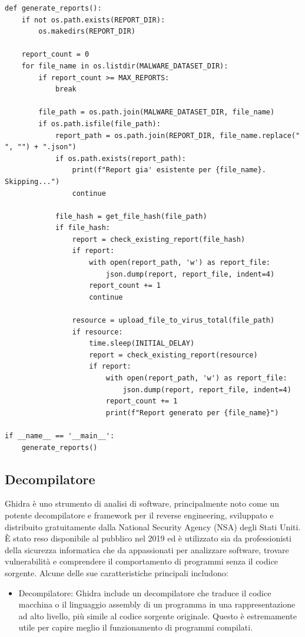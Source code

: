 \begin{lstlisting}[caption={Codice Python per la generazione del report in formato JSON da VirusTotal},captionpos=b]
def generate_reports():
    if not os.path.exists(REPORT_DIR):
        os.makedirs(REPORT_DIR)
    
    report_count = 0
    for file_name in os.listdir(MALWARE_DATASET_DIR):
        if report_count >= MAX_REPORTS:
            break
        
        file_path = os.path.join(MALWARE_DATASET_DIR, file_name)
        if os.path.isfile(file_path):
            report_path = os.path.join(REPORT_DIR, file_name.replace(" ", "") + ".json")
            if os.path.exists(report_path):
                print(f"Report gia' esistente per {file_name}. Skipping...")
                continue
            
            file_hash = get_file_hash(file_path)
            if file_hash:
                report = check_existing_report(file_hash)
                if report:
                    with open(report_path, 'w') as report_file:
                        json.dump(report, report_file, indent=4)
                    report_count += 1
                    continue
                
                resource = upload_file_to_virus_total(file_path)
                if resource:
                    time.sleep(INITIAL_DELAY)  
                    report = check_existing_report(resource)
                    if report:
                        with open(report_path, 'w') as report_file:
                            json.dump(report, report_file, indent=4)
                        report_count += 1
                        print(f"Report generato per {file_name}")

if __name__ == '__main__':
    generate_reports()
\end{lstlisting}

\subsection{Decompilatore}
Ghidra è uno strumento di analisi di software, principalmente noto come un potente decompilatore e framework per il reverse engineering, sviluppato e distribuito gratuitamente dalla National Security Agency (NSA) degli Stati Uniti. È stato reso disponibile al pubblico nel 2019 ed è utilizzato sia da professionisti della sicurezza informatica che da appassionati per analizzare software, trovare vulnerabilità e comprendere il comportamento di programmi senza il codice sorgente. Alcune delle sue caratteristiche principali includono:
\begin{itemize}
    \item Decompilatore: Ghidra include un decompilatore che traduce il codice macchina o il linguaggio assembly di un programma in una rappresentazione ad alto livello, più simile al codice sorgente originale. Questo è estremamente utile per capire meglio il funzionamento di programmi compilati.
\end{itemize}


